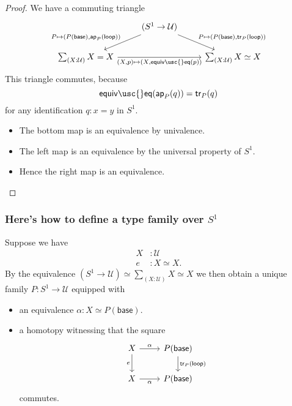 \documentclass[handout]{beamer}
\newcommand{\UU}{\mathcal{U}}
\newcommand{\sphere}[1]{S^{#1}}
\newcommand{\ap}{\mathsf{ap}}
\newcommand{\baseS}{\mathsf{base}}
\newcommand{\loopS}{\mathsf{loop}}
\newcommand{\tr}{\mathsf{tr}}
\newcommand{\equiveq}{\mathsf{equiv\usc{}eq}}
\begin{document}
\begin{frame}
  \begin{proof}
    We have a commuting triangle
    \begin{equation*}
      \begin{tikzcd}[ampersand replacement=\&]
        \& (\sphere{1}\to\UU) \arrow[dl,swap,"{P\mapsto(P(\baseS),\ap_P(\loopS))}"] \arrow[dr,"{P\mapsto(P(\baseS),\tr_P(\loopS))}"] \\
        \sum_{(X:\UU)}X=X \arrow[rr,swap,"{(X,p)\mapsto(X,\equiveq(p))}"] \& \& \sum_{(X:\UU)}X\simeq X
      \end{tikzcd}
    \end{equation*}
    This triangle commutes, because
    \begin{equation*}
      \equiveq(\ap_P(q))=\tr_P(q)
    \end{equation*}
    for any identification $q:x=y$ in $\sphere{1}$.
    \begin{itemize}
    \item The bottom map is an equivalence by univalence.
    \item The left map is an equivalence by the universal property of $\sphere{1}$.
    \item Hence the right map is an equivalence.\qedhere
    \end{itemize}
  \end{proof}
\end{frame}

\begin{frame}
  \frametitle{Here's how to define a type family over $\sphere{1}$}
  Suppose we have
  \begin{align*}
    X & : \UU \\
    e & : X \simeq X.
  \end{align*}
  By the equivalence $(\sphere{1}\to\UU)\simeq\sum_{(X:\UU)}X\simeq X$ we then obtain a unique family $P:\sphere{1}\to\UU$ equipped with
  \begin{itemize}
  \item an equivalence $\alpha:X\simeq P(\baseS)$.
  \item a homotopy witnessing that the square
    \begin{equation*}
      \begin{tikzcd}[ampersand replacement=\&]
        X \arrow[d,swap,"e"] \arrow[r,"\alpha"] \& P(\baseS) \arrow[d,"\tr_P(\loopS)"] \\
        X \arrow[r,swap,"\alpha"] \& P(\baseS)
      \end{tikzcd}
    \end{equation*}
    commutes.
  \end{itemize}
\end{frame}
\end{document}
